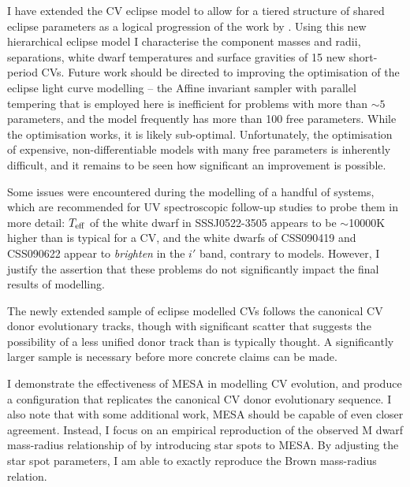 \label{chpt:conclusion} %

I have extended the CV eclipse model to allow for a tiered structure of shared eclipse parameters as a logical progression of the work by \citet{McallisterThesis}.
Using this new hierarchical eclipse model I characterise the component masses and radii, separations, white dwarf temperatures and surface gravities of 15 new short-period CVs.
Future work should be directed to improving the optimisation of the eclipse light curve modelling -- the Affine invariant sampler with parallel tempering that is employed here is inefficient for problems with more than $\sim5$ parameters, and the model frequently has more than 100 free parameters.
While the optimisation works, it is likely sub-optimal. Unfortunately, the optimisation of expensive, non-differentiable models with many free parameters is inherently difficult, and it remains to be seen how significant an improvement is possible.

Some issues were encountered during the modelling of a handful of systems, which are recommended for UV spectroscopic follow-up studies to probe them in more detail: $T_{\rm eff}$ of the white dwarf in SSSJ0522-3505 appears to be $\sim$10000K higher than is typical for a CV, and the white dwarfs of CSS090419 and CSS090622 appear to \textit{brighten} in the $i'$ band, contrary to models.
However, I justify the assertion that these problems do not significantly impact the final results of modelling.

The newly extended sample of eclipse modelled CVs follows the canonical CV donor evolutionary tracks, though with significant scatter that suggests the possibility of a less unified donor track than is typically thought. A significantly larger sample is necessary before more concrete claims can be made.

I demonstrate the effectiveness of MESA in modelling CV evolution, and produce a configuration that replicates the canonical CV donor evolutionary sequence. I also note that with some additional work, MESA should be capable of even closer agreement.
Instead, I focus on an empirical reproduction of the observed M dwarf mass-radius relationship of \citet{brown2022} by introducing star spots to MESA. By adjusting the star spot parameters, I am able to exactly reproduce the Brown mass-radius relation.

